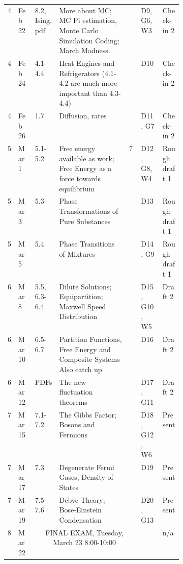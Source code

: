 \documentclass[12pt]{article}
\begin{document}
{\begin{table}[]
\begin{tabular}{p{.03\linewidth}|p{.065\linewidth}|p{.065\linewidth}|p{0.4\linewidth}|p{.08\linewidth}|p{.085\linewidth}|p{.1\linewidth}}
4    & Feb 22 & 8.2, Ising.pdf & More about MC; MC Pi estimation, Monte Carlo Simulation Coding; March Madness. &                                           & D9, G6, W3   & Check-in 2    \\
4    & Feb 24 & 4.1-4.4        & Heat Engines and Refrigerators (4.1-4.2 are much more important than 4.3-4.4)       &                                           & D10          & Check-in 2    \\
4    & Feb 26 & 1.7            & Diffusion, rates                                                                    &                                           & D11, G7      & Check-in 2    \\ \hline
5    & Mar 1  & 5.1-5.2        & Free energy available as work; Free Energy as a force towards equilibrium           & 7                                       & D12, G8, W4  & Rough draft 1 \\
5    & Mar 3  & 5.3            & Phase Transformations of Pure Substances                                            &                                           & D13          & Rough draft 1 \\
5    & Mar 5  & 5.4            & Phase Transitions of Mixtures                                                       &                                           & D14, G9      & Rough draft 1 \\ \hline
6    & Mar 8  & 5.5, 6.3-6.4   & Dilute Solutions; Equipartition; Maxwell Speed Distribution                         &                                           & D15, G10, W5 & Draft 2 \\
6    & Mar 10 & 6.5-6.7        & Partition Functions, Free Energy and Composite Systems Also catch up                &                                           & D16          & Draft 2 \\
6    & Mar 12 & PDFs           & The new fluctuation theorems                                                        &                                           & D17, G11     & Draft 2 \\ \hline
7    & Mar 15 & 7.1-7.2        & The Gibbs Factor; Bosons and Fermions                                               &                                           & D18, G12, W6 & Present \\
7    & Mar 17 & 7.3            & Degenerate Fermi Gases, Density of States                                           &                                           & D19          & Present \\
7    & Mar 19 & 7.5-7.6        & Debye Theory; Bose-Einstein Condensation                                  &                                           & D20, G13     & Present \\ \hline
8    & Mar 22 & \multicolumn{3}{c}{FINAL EXAM, Tuesday, March 23 8:00-10:00}                                                                                                    & &n/a          
\end{tabular}
\end{table}
}
\end{document}
